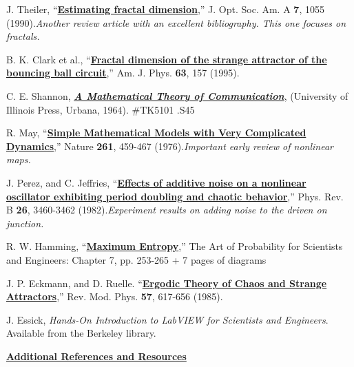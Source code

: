 \documentclass{../lab}
\begin{document}
\begin{thebibliography}{}
     J. Theiler, ``\href{https://drive.google.com/file/d/15p3_9FcN3peArY5bZHTgjrprMLsyU6rz/view?usp=drive_link}{\textbf{Estimating fractal dimension}},'' J. Opt. Soc. Am. A \textbf{7}, 1055 (1990).\emph{Another review article with an excellent bibliography. This one focuses on fractals.}


     B. K. Clark et al., ``\href{https://drive.google.com/file/d/1yP0OprCTBLjnIyHcWEcGm-HNyUVVNLs9/view?usp=drive_link}{\textbf{Fractal dimension of the strange attractor of the bouncing ball circuit}},'' Am. J. Phys. \textbf{63}, 157 (1995).

     C. E. Shannon, \href{https://berkeley-physics111b.github.io/assets/pdf/oldwebsitestructure/mathematicaltheorycommunication.pdf}{\textbf{\emph{A Mathematical Theory of Communication}}}, (University of Illinois Press, Urbana, 1964). \#TK5101 .S45

     R. May, ``\href{https://drive.google.com/file/d/1jg3jsG-43OfxH4awoJ7-G4iMFtrmJqRy/view?usp=drive_link}{\textbf{Simple Mathematical Models with Very Complicated Dynamics}},'' Nature \textbf{261}, 459-467 (1976).\emph{Important early review of nonlinear maps.}

     J. Perez, and C. Jeffries, ``\href{https://drive.google.com/file/d/114Myo0TtZv5noj0vVylLlIiPXCduMo_-/view?usp=drive_link}{\textbf{Effects of additive noise on a nonlinear oscillator exhibiting period doubling and chaotic behavior}},'' Phys. Rev. B \textbf{26}, 3460-3462 (1982).\emph{Experiment results on adding noise to the driven on junction.}

     R. W. Hamming, ``\href{https://drive.google.com/file/d/1ZUt00RXoMZZJF2Vx8CDAN2nn74Eswsvi/view?usp=drive_link}{\textbf{Maximum Entropy}},'' The Art of Probability for Scientists and Engineers: Chapter 7, pp. 253-265 + 7 pages of diagrams

     J. P. Eckmann, and D. Ruelle. ``\href{https://drive.google.com/file/d/1sVh8phqA6glEr3WUJ8nD2iStkUww9UvK/view?usp=drive_link}{\textbf{Ergodic Theory of Chaos and Strange Attractors}},'' Rev. Mod. Phys. \textbf{57}, 617-656 (1985).

     J. Essick, \emph{Hands-On Introduction to LabVIEW for Scientists and Engineers}. Available from the Berkeley library.


    \href{https://drive.google.com/file/d/1YQavixLqNecs7C43Q6ospzAvy2L2wZor/view?usp=drive_link}{\textbf{Additional References and Resources}}
    
\end{thebibliography}
\endgroup
\end{document}
